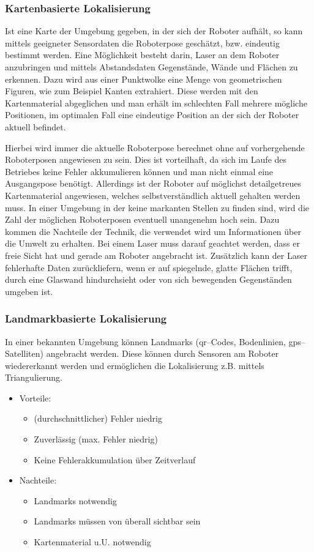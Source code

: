 \subsubsection{Kartenbasierte Lokalisierung}

Ist eine Karte der Umgebung gegeben, in der sich der Roboter aufhält, so kann mittels geeigneter Sensordaten die Roboterpose geschätzt, bzw. eindeutig bestimmt werden. Eine Möglichkeit besteht darin, Laser an dem Roboter anzubringen und mittels Abstandsdaten Gegenstände, Wände und Flächen zu erkennen. Dazu wird aus einer Punktwolke eine Menge von geometrischen Figuren, wie zum Beispiel Kanten extrahiert. Diese werden mit den Kartenmaterial abgeglichen und man erhält im schlechten Fall mehrere mögliche Positionen, im optimalen Fall eine eindeutige Position an der sich der Roboter aktuell befindet.

Hierbei wird immer die aktuelle Roboterpose berechnet ohne auf vorhergehende Roboterposen angewiesen zu sein. Dies ist vorteilhaft, da sich im Laufe des Betriebes keine Fehler akkumulieren können und man nicht einmal eine Ausgangspose benötigt. Allerdings ist der Roboter auf möglichst detailgetreues Kartenmaterial angewiesen, welches selbstverständlich aktuell gehalten werden muss. In einer Umgebung in der keine markanten Stellen zu finden sind, wird die Zahl der möglichen Roboterposen eventuell unangenehm hoch sein. Dazu kommen die Nachteile der Technik, die verwendet wird um Informationen über die Umwelt zu erhalten. Bei einem Laser muss darauf geachtet werden, dass er freie Sicht hat und gerade am Roboter angebracht ist. Zusätzlich kann der Laser fehlerhafte Daten zurückliefern, wenn er auf spiegelnde, glatte Flächen trifft, durch eine Glaswand hindurchsieht oder von sich bewegenden Gegenständen umgeben ist.  

\subsubsection{Landmarkbasierte Lokalisierung}

In einer bekannten Umgebung können Landmarks (\gls{qr}--Codes, Bodenlinien,
 \gls{gps}--Satelliten) angebracht werden. Diese können durch Sensoren
 am Roboter wiedererkannt werden und ermöglichen die Lokalisierung
 z.B. mittels Triangulierung.

\begin{itemize}
  \item Vorteile:
  \begin{itemize}
    \item (durchschnittlicher) Fehler niedrig
    \item Zuverlässig (max. Fehler niedrig)
    \item Keine Fehlerakkumulation über Zeitverlauf
  \end{itemize}
  \item Nachteile:
  \begin{itemize}
    \item Landmarks notwendig
    \item Landmarks müssen von überall sichtbar sein
    \item Kartenmaterial u.U. notwendig
   \end{itemize}
\end{itemize}

